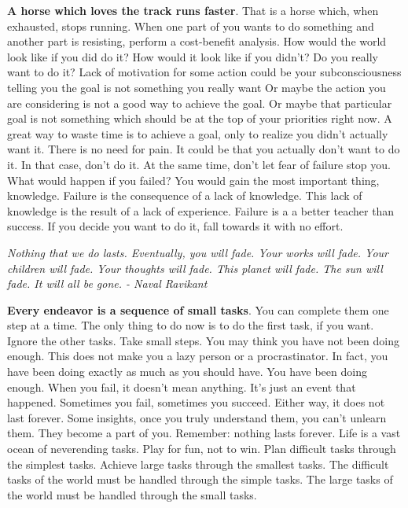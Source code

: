 \documentclass[a4paper,hidelinks]{article}
\begin{document}
\textbf{A horse which loves the track runs faster}.
That is a horse which, when exhausted, stops running.
When one part of you wants to do something and another part is resisting, perform a cost-benefit analysis.
How would the world look like if you did do it?
How would it look like if you didn't?
Do you really want to do it?
Lack of motivation for some action could be your subconsciousness telling you the goal is not something you really want
Or maybe the action you are considering is not a good way to achieve the goal.
Or maybe that particular goal is not something which should be at the top of your priorities right now.
A great way to waste time is to achieve a goal, only to realize you didn’t actually want it.
There is no need for pain.
It could be that you actually don't want to do it.
In that case, don't do it.
At the same time, don't let fear of failure stop you.
What would happen if you failed?
You would gain the most important thing, knowledge.
Failure is the consequence of a lack of knowledge.
This lack of knowledge is the result of a lack of experience.
Failure is a a better teacher than success.
If you decide you want to do it, fall towards it with no effort.

\newpage

\begin{center}
\textit{Nothing that we do lasts. Eventually, you will fade. Your works will fade. Your children will fade. Your thoughts will fade. This planet will fade. The sun will fade. It will all be gone. - Naval Ravikant}
\end{center}

\textbf{Every endeavor is a sequence of small tasks}.
You can complete them one step at a time.
The only thing to do now is to do the first task, if you want.
Ignore the other tasks.
Take small steps.
You may think you have not been doing enough.
This does not make you a lazy person or a procrastinator.
In fact, you have been doing exactly as much as you should have.
You have been doing enough.
When you fail, it doesn't mean anything.
It's just an event that happened.
Sometimes you fail, sometimes you succeed.
Either way, it does not last forever.
Some insights, once you truly understand them, you can’t unlearn them.
They become a part of you.
Remember: nothing lasts forever.
Life is a vast ocean of neverending tasks.
Play for fun, not to win.
Plan difficult tasks through the simplest tasks.
Achieve large tasks through the smallest tasks.
The difficult tasks of the world must be handled through the simple tasks.
The large tasks of the world must be handled through the small tasks.
\end{document}
